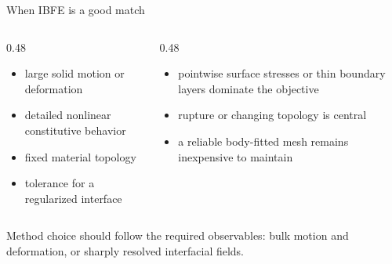 \documentclass[aspectratio=169,11pt]{beamer}
\begin{document}
\begin{frame}{When IBFE is a good match}
\begin{columns}[T,onlytextwidth]
\begin{column}{0.48\textwidth}
\begin{itemize}\itemsep6pt
  \item large solid motion or deformation
  \item detailed nonlinear constitutive behavior
  \item fixed material topology
  \item tolerance for a regularized interface
\end{itemize}
\end{column}
\begin{column}{0.48\textwidth}
\begin{itemize}\itemsep6pt
  \item pointwise surface stresses or thin boundary layers dominate the objective
  \item rupture or changing topology is central
  \item a reliable body-fitted mesh remains inexpensive to maintain
\end{itemize}
\end{column}
\end{columns}

\medskip
\begin{punchbox}
Method choice should follow the required observables: bulk motion and deformation, or sharply resolved interfacial fields.
\end{punchbox}
\end{frame}
\end{document}
